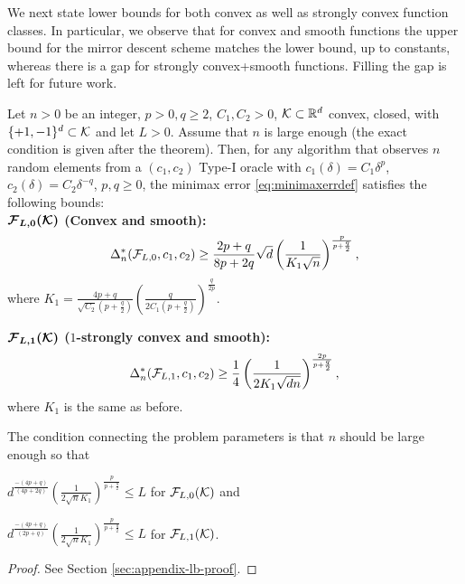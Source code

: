 We next state lower bounds for both convex as well as strongly convex function classes. In particular, we observe that for convex and smooth functions the upper bound for the mirror descent scheme matches the lower bound, up to constants, whereas there is a gap for strongly convex+smooth functions.
Filling the gap is left for future work.
\begin{theorem}
\label{thm:lb-convex}
Let $n>0$ be an integer, $p>0, q\ge 2$, $C_1,C_2>0$, 
$\mathcal{K}\subset \mathbb{R}^d$ convex, closed, with  $\{+1,-1\}^d\subset \mathcal{K}$ and let $L>0$.
Assume that $n$ is large enough (the exact condition is given after the theorem). 
Then, for any algorithm that observes $n$ random elements from a $(c_1,c_2)$ Type-I oracle 
 with $c_1(\delta) = C_1 \delta^p$, $c_2(\delta) = C_2 \delta^{-q}$, $p,q\ge 0$,
 the minimax error \eqref{eq:minimaxerrdef} satisfies the following bounds:\\
\textbf{$\bm{\mathcal{F}_{L,0}(\mathcal{K})}$ (Convex and smooth):}
\[
\Delta_n^{*}(\mathcal{F}_{L,0}, c_1,c_2) \ge \dfrac{2p+q}{8p+2q}\sqrt{d}\left(\dfrac{1}{ K_1 \sqrt n}\right)^{\frac{p}{p+\frac{q}{2}}},
\]
where $K_1 =\frac{4p+q}{\sqrt{C_2}(p+\tfrac{q}{2})} \left(\frac{q}{2C_1(p+\tfrac{q}{2})}\right)^{\frac{q}{2p}}$.

\textbf{$\bm{\mathcal{F}_{L,1}(\mathcal{K})}$ ($1$-strongly convex and smooth):}
\[
\Delta_n^{*}(\mathcal{F}_{L,1}, c_1,c_2) \ge \dfrac{1}{4}  \left(\dfrac{1}{2 K_1 \sqrt {d n}}\right)^{\frac{2p}{p+\frac{q}{2}}}, 
\]
where $K_1$ is the same as before.
\end{theorem}
The condition connecting the problem parameters is that $n$ should be large enough so that\\
\begin{inparaenum}[\bfseries (i)]
\item $d^{\frac{-(4p+q)}{(4p+2q)}}\left(\frac{1}{2\sqrt{n} K_1} \right)^{\frac{p}{p+\frac{q}{2}}}\le L$ for $\mathcal{F}_{L,0}(\mathcal{K})$ and\\
\item $d^{\frac{-(4p+q)}{(2p+q)}}\left(\frac{1}{2\sqrt{n} K_1} \right)^{\frac{p}{p+\frac{q}{2}}} \le L$ for $\mathcal{F}_{L,1}(\mathcal{K})$.
\end{inparaenum}
\begin{proof}
 See Section \ref{sec:appendix-lb-proof}.
\end{proof}

